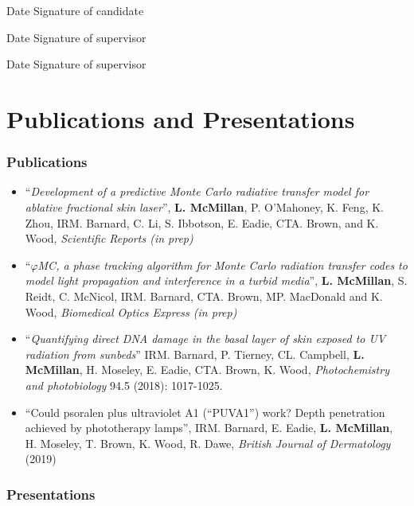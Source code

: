 \documentclass[10pt,a4paper,twoside]{book}
\begin{document}
\medskip

Date\dotfill \hspace{1cm} Signature of candidate \dotfill

\medskip

Date\dotfill \hspace{1cm} Signature of supervisor \dotfill

\medskip

\indent Date\dotfill \hspace{1cm} Signature of supervisor \dotfill

\chapter*{Publications and Presentations}
\subsection*{Publications}
\begin{itemize}

\item ``\textit{Development of a predictive Monte Carlo radiative transfer model for ablative fractional skin laser}'', \textbf{L. McMillan}, P. O'Mahoney, K. Feng, K. Zhou, IRM. Barnard, C. Li, S. Ibbotson, E. Eadie, CTA. Brown, and K. Wood, \textit{Scientific Reports (in prep)}

\item ``\textit{$\varphi$MC, a phase tracking algorithm for Monte Carlo radiation transfer codes to model light propagation and interference in a turbid media}'', \textbf{L. McMillan}, S. Reidt, C. McNicol, IRM. Barnard, CTA. Brown, MP. MacDonald and K. Wood, \textit{Biomedical Optics Express (in prep)}

\item ``\textit{Quantifying direct DNA damage in the basal layer of skin exposed to UV radiation from sunbeds}'' IRM. Barnard, P. Tierney, CL. Campbell, \textbf{L. McMillan}, H. Moseley, E. Eadie, CTA. Brown, K. Wood, \textit{Photochemistry and photobiology} 94.5 (2018): 1017-1025.

\item ``Could psoralen plus ultraviolet A1 (“PUVA1”) work? Depth penetration achieved by phototherapy lamps'', IRM. Barnard, E. Eadie, \textbf{L. McMillan}, H. Moseley, T. Brown, K. Wood, R. Dawe, \textit{British Journal of Dermatology} (2019)

\end{itemize}

\subsection*{Presentations}
\end{document}
